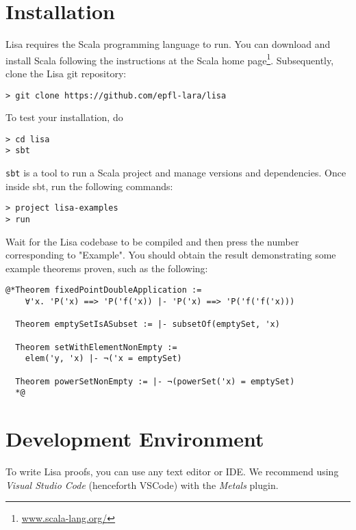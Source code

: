 \section{Installation}
Lisa requires the Scala programming language to run. You can download and install Scala following the instructions at the Scala home page\footnote{\url{www.scala-lang.org/}}. Subsequently, clone the Lisa git repository:
\begin{lstlisting}[language=console]
> git clone https://github.com/epfl-lara/lisa
\end{lstlisting}
To test your installation, do
\begin{lstlisting}[language=console]
> cd lisa
> sbt
\end{lstlisting}
\lstinline|sbt| is a tool to run a Scala project and manage versions and dependencies. Once inside sbt, run the following commands:
\begin{lstlisting}[language=console]
> project lisa-examples
> run
\end{lstlisting}
Wait for the Lisa codebase to be compiled and then press the number corresponding to "Example". You should obtain the result demonstrating some example theorems proven, such as the following:

\noindent\begin{minipage}{\linewidth}\vspace{1em}
\begin{lstlisting}[language=console]
  @*Theorem fixedPointDoubleApplication := 
    ∀'x. 'P('x) ==> 'P('f('x)) |- 'P('x) ==> 'P('f('f('x)))

  Theorem emptySetIsASubset := |- subsetOf(emptySet, 'x)

  Theorem setWithElementNonEmpty := 
    elem('y, 'x) |- ¬('x = emptySet)

  Theorem powerSetNonEmpty := |- ¬(powerSet('x) = emptySet)
  *@
\end{lstlisting}
\end{minipage}

\section{Development Environment}
To write Lisa proofs, you can use any text editor or IDE. We recommend using \emph{Visual Studio Code} (henceforth VSCode) with the \emph{Metals} plugin.

